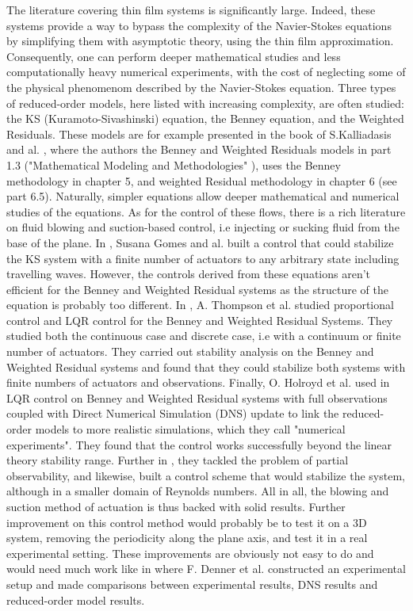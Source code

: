 \documentclass[12pt]{article}
\begin{document}
The literature covering thin film systems is significantly large. Indeed, these systems provide a way to bypass the complexity 
of the Navier-Stokes equations by simplifying them with asymptotic theory, using the thin film approximation. Consequently, 
one can perform deeper mathematical studies and less computationally heavy numerical experiments, with the cost of neglecting some of 
the physical phenomenom described by the Navier-Stokes equation. Three types of reduced-order models, here listed with increasing complexity, are 
often studied: the KS (Kuramoto-Sivashinski) equation, the Benney equation, and the Weighted Residuals. These models are for example presented in the
book of S.Kalliadasis and al. \cite{Kalliadasis2011FallingLF}, where the authors the Benney and Weighted Residuals models in part 1.3 ("Mathematical Modeling and Methodologies"
), uses the Benney methodology in chapter 5, and weighted Residual methodology in chapter 6 (see part 6.5).
 Naturally, simpler equations allow deeper mathematical and numerical studies of the equations. As for the control of these flows, there is a rich literature on fluid blowing and suction-based control,
 i.e injecting or sucking fluid from the base of the plane. In \cite{gomes2015stabilisingnontrivialsolutionsgeneralised}, Susana Gomes and al.
 built a control that could stabilize the KS system with a finite number of actuators to any arbitrary state including travelling waves.
  However, the controls derived from these equations aren't efficient for the Benney and 
 Weighted Residual systems as the structure of the equation is probably too different. In \cite{Thompson_2016_prop_ctrl}, A. Thompson 
 et al. studied proportional control and LQR control for the Benney and Weighted Residual Systems. They studied both the continuous 
 case and discrete case, i.e with a continuum or finite number of actuators. They carried out stability analysis on the Benney and
  Weighted Residual systems and found that they could stabilize both systems with finite numbers of actuators and observations. 
  Finally, O. Holroyd et al. used in \cite{holroyd2023linearquadraticregulationcontrol} LQR control on Benney and Weighted Residual 
  systems with full observations coupled with Direct Numerical Simulation (DNS) update to link the reduced-order models to more 
  realistic simulations, which they call "numerical experiments". They found that the control works successfully beyond the linear
   theory stability range. Further in \cite{holroyd2024stabilisationfallingliquidfilms}, they tackled the problem of partial observability,
    and likewise, built a control scheme that would stabilize the system, although in a smaller domain of Reynolds numbers. All in all, the
blowing and suction method of actuation is thus backed with solid results. Further improvement on this control method would probably 
be to test it on a 3D system, removing the periodicity along the plane axis, and test it in a real experimental setting. These improvements 
are obviously not easy to do and would need much work like in \cite{Experimental_DNS_Reduced_order_modelling_paper} where F. Denner et al. 
constructed an experimental setup and made comparisons between experimental results, DNS results and reduced-order model results. 
\\
\end{document}
